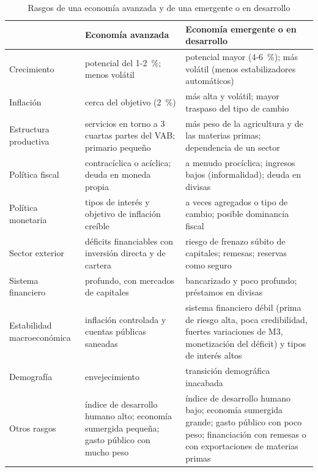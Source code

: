 \documentclass[11pt]{article}
\begin{document}
\begin{table}[!htb]
\centering\footnotesize
\caption{Rasgos de una economía avanzada y de una emergente o en desarrollo}\label{tab:avanzada-emergente}
\begin{tabular}{>{\raggedright\arraybackslash}p{2.9cm}>{\raggedright\arraybackslash}p{5.4cm}>{\raggedright\arraybackslash}p{5.4cm}}
\toprule
\rowcolor{tceeazulpalido}
 & \textbf{Economía avanzada} & \textbf{Economía emergente o en desarrollo} \\
\midrule
Crecimiento & potencial del 1-2~\%; menos volátil & potencial mayor (4-6~\%); más volátil (menos estabilizadores automáticos) \\
Inflación & cerca del objetivo (2~\%) & más alta y volátil; mayor traspaso del tipo de cambio \\
Estructura productiva & servicios en torno a 3 cuartas partes del VAB; primario pequeño & más peso de la agricultura y de las materias primas; dependencia de un sector \\
Política fiscal & contracíclica o acíclica; deuda en moneda propia & a menudo procíclica; ingresos bajos (informalidad); deuda en divisas \\
Política monetaria & tipos de interés y objetivo de inflación creíble & a veces agregados o tipo de cambio; posible dominancia fiscal \\
Sector exterior & déficits financiables con inversión directa y de cartera & riesgo de frenazo súbito de capitales; remesas; reservas como seguro \\
Sistema financiero & profundo, con mercados de capitales & bancarizado y poco profundo; préstamos en divisas \\
Estabilidad macroeconómica & inflación controlada y cuentas públicas saneadas & sistema financiero débil (prima de riesgo alta, poca credibilidad, fuertes variaciones de M3, monetización del déficit) y tipos de interés altos \\
Demografía & envejecimiento & transición demográfica inacabada \\
Otros rasgos & índice de desarrollo humano alto; economía sumergida pequeña; gasto público con mucho peso & índice de desarrollo humano bajo; economía sumergida grande; gasto público con poco peso; financiación con remesas o con exportaciones de materias primas \\
\bottomrule
\end{tabular}
\end{table}
\end{document}
